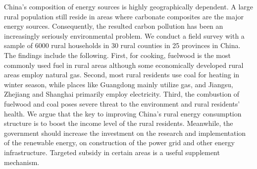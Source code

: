 China's composition of energy sources is highly geographically dependent. A large rural population still reside in areas where carbonate composites are the major energy sources. Consequently, the resulted carbon pollution has been an increasingly seriously environmental problem. We conduct a field survey with a sample of 6000 rural households in 30 rural counties in 25 provinces in China. The findings include the following. First, for cooking, fuelwood is the most commonly used fuel in rural areas although some economically developed rural areas employ natural gas. Second, most rural residents use coal for heating in winter season, while places like Guangdong mainly utilize gas, and Jiangsu, Zhejiang and Shanghai primarily employ electricity. Third, the combustion of fuelwood and coal poses severe threat to the environment and rural residents' health. We argue that the key to improving China's rural energy consumption structure is to boost the income level of the rural residents. Meanwhile, the government should increase the investment on the research and implementation of the renewable energy, on construction of the power grid and other energy infrastructure. Targeted subsidy in certain areas is a useful supplement mechanism.